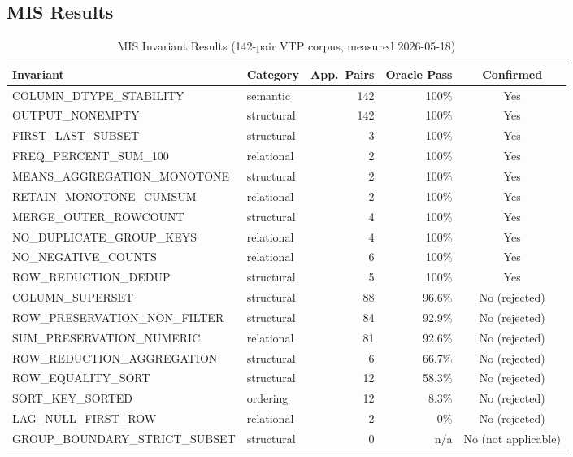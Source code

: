 \documentclass[conference]{IEEEtran}
\begin{document}
\subsection{MIS Results}

\begin{table}[t]
  \caption{MIS Invariant Results (142-pair VTP corpus, measured 2026-05-18)}
  \label{tab:mis}
  \centering
  \small
  \begin{tabular}{@{}l l r r c@{}}
    \toprule
    \textbf{Invariant} & \textbf{Category} & \textbf{App.\ Pairs}
      & \textbf{Oracle Pass} & \textbf{Confirmed} \\
    \midrule
    COLUMN\_DTYPE\_STABILITY       & semantic    & 142 & 100\% & Yes \\
    OUTPUT\_NONEMPTY               & structural  & 142 & 100\% & Yes \\
    FIRST\_LAST\_SUBSET            & structural  &   3 & 100\% & Yes \\
    FREQ\_PERCENT\_SUM\_100        & relational  &   2 & 100\% & Yes \\
    MEANS\_AGGREGATION\_MONOTONE   & structural  &   2 & 100\% & Yes \\
    RETAIN\_MONOTONE\_CUMSUM       & relational  &   2 & 100\% & Yes \\
    MERGE\_OUTER\_ROWCOUNT         & structural  &   4 & 100\% & Yes \\
    NO\_DUPLICATE\_GROUP\_KEYS     & relational  &   4 & 100\% & Yes \\
    NO\_NEGATIVE\_COUNTS           & relational  &   6 & 100\% & Yes \\
    ROW\_REDUCTION\_DEDUP          & structural  &   5 & 100\% & Yes \\
    \midrule
    COLUMN\_SUPERSET               & structural  &  88 & 96.6\% & No (rejected) \\
    ROW\_PRESERVATION\_NON\_FILTER & structural  &  84 & 92.9\% & No (rejected) \\
    SUM\_PRESERVATION\_NUMERIC     & relational  &  81 & 92.6\% & No (rejected) \\
    ROW\_REDUCTION\_AGGREGATION    & structural  &   6 & 66.7\% & No (rejected) \\
    ROW\_EQUALITY\_SORT            & structural  &  12 & 58.3\% & No (rejected) \\
    SORT\_KEY\_SORTED              & ordering    &  12 &  8.3\% & No (rejected) \\
    LAG\_NULL\_FIRST\_ROW          & relational  &   2 &  0\%   & No (rejected) \\
    GROUP\_BOUNDARY\_STRICT\_SUBSET& structural  &   0 &  n/a   & No (not applicable) \\
    \bottomrule
  \end{tabular}
\end{table}
\end{document}
